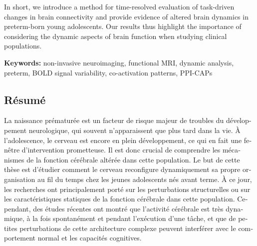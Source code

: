 \hspace{1cm} In short, we introduce a method for time-resolved evaluation of task-driven changes in brain connectivity and provide evidence of altered brain dynamics in preterm-born young adolescents. Our results thus highlight the importance of considering the dynamic aspects of brain function when studying clinical populations.

\vspace{0.5cm}

\textbf{Keywords:} non-invasive neuroimaging, functional MRI, dynamic analysis, preterm, BOLD signal variability, co-activation patterns, PPI-CAPs



\begin{otherlanguage}{french}
\cleardoublepage
\chapter*{Résumé}

La naissance prématurée est un facteur de risque majeur de troubles du développement neurologique, qui souvent n'apparaissent que plus tard dans la vie. À l'adolescence, le cerveau est encore en plein développement, ce qui en fait une fenêtre d'intervention prometteuse. Il est donc crucial de comprendre les mécanismes de la fonction cérébrale altérée dans cette population. Le but de cette thèse est d'étudier comment le cerveau reconfigure dynamiquement sa propre organisation au fil du temps chez les jeunes adolescents nés avant terme. À ce jour, les recherches ont principalement porté sur les perturbations structurelles ou sur les caractéristiques statiques de la fonction cérébrale dans cette population. Cependant, des études récentes ont montré que l'activité cérébrale est très dynamique, à la fois spontanément et pendant l'exécution d'une tâche, et que de petites perturbations de cette architecture complexe peuvent interférer avec le comportement normal et les capacités cognitives.



\end{otherlanguage}
